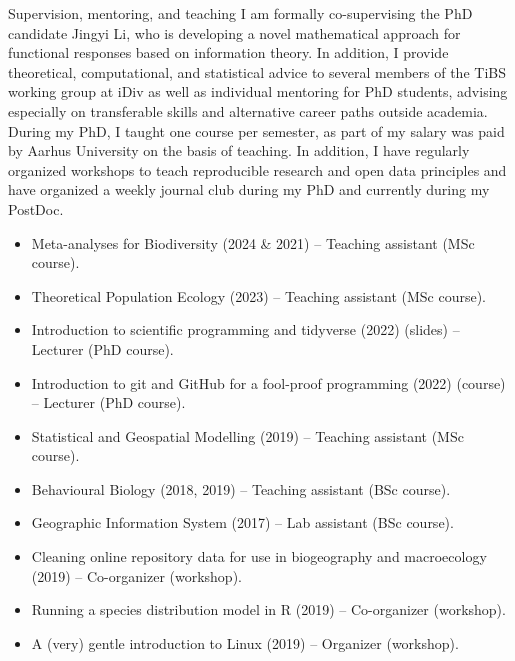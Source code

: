 \documentclass{resume} %
\begin{document}
\begin{rSection}{Supervision, mentoring, and teaching}
I am formally co-supervising the PhD candidate Jingyi Li, who is developing a novel mathematical approach for functional responses based on information theory. 
In addition, I provide theoretical, computational, and statistical advice to several members of the TiBS working group at iDiv as well as individual mentoring for PhD students, advising especially on transferable skills and alternative career paths outside academia.
During my PhD, I taught one course per semester, as part of my salary was paid by Aarhus University on the basis of teaching.
In addition, I have regularly organized workshops to teach reproducible research and open data principles and have organized a weekly journal club during my PhD and currently during my PostDoc.
\begin{itemize}
    \setlength\itemsep{-0.5em}
    \item Meta-analyses for Biodiversity (2024 \& 2021) – Teaching assistant (MSc course).
    \item Theoretical Population Ecology (2023) – Teaching assistant (MSc course).
    \item Introduction to scientific programming and tidyverse (2022) (slides) – Lecturer (PhD course).
    \item Introduction to git and GitHub for a fool-proof programming (2022) (course) – Lecturer (PhD course).
    \item Statistical and Geospatial Modelling (2019) – Teaching assistant (MSc course).
    \item Behavioural Biology (2018, 2019) – Teaching assistant (BSc course).
    \item Geographic Information System (2017) – Lab assistant (BSc course).
    \item Cleaning online repository data for use in biogeography and macroecology (2019) -- Co-organizer (workshop).
    \item Running a species distribution model in R (2019) -- Co-organizer (workshop).
    \item A (very) gentle introduction to Linux (2019) -- Organizer (workshop).
\end{itemize}
\end{rSection}
\end{document}
